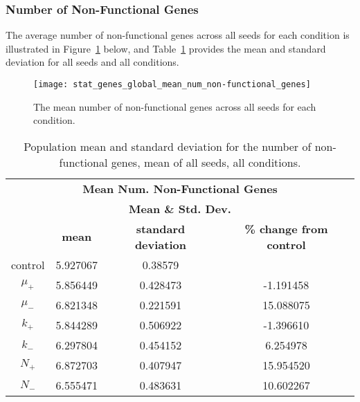 \subsubsection{Number of Non-Functional Genes}\label{results:number_non-functional_genes}
The average number of non-functional genes across all seeds for each condition is illustrated in Figure~\ref{fig:mean_num_non-functional_genes} below, and Table~\ref{table:non-functional_genes_mean_std_dev} provides the mean and standard deviation for all seeds and all conditions.  

\begin{figure}[H]
	\centering
	\texttt{[image: stat\_genes\_global\_mean\_num\_non-functional\_genes]}
	\caption[Mean number of non-functional genes]{The mean number of non-functional genes across all seeds for each condition.}
	\label{fig:mean_num_non-functional_genes}
\end{figure}


\begin{table}[h]
	\centering
	\begin{tabular}{|c|c|c|c|}
		\hline
		\multicolumn{4}{c}{\Large \textbf{Mean Num. Non-Functional Genes}} \\
		\multicolumn{4}{c}{\Large \textbf{Mean \& Std. Dev.}} \\
		\hline
		& \textbf{mean} & \textbf{standard deviation} & \textbf{\% change from control} \\
		\hline
		control & 5.927067 & 0.38579 & \textemdash \\ 
		\hline
		$\mu_+$ & 5.856449 & 0.428473 & -1.191458 \\ 
		\hline
		$\mu_-$ & 6.821348 & 0.221591 & 15.088075 \\ 
		\hline
		$k_+$ & 5.844289 & 0.506922 & -1.396610 \\ 
		\hline
		$k_-$ & 6.297804 & 0.454152 & 6.254978 \\ 
		\hline
		$N_+$ & 6.872703 & 0.407947 & 15.954520 \\ 
		\hline
		$N_-$ & 6.555471 & 0.483631 & 10.602267 \\ 
		\hline
	\end{tabular}
	\caption[Number of Non-functional Genes - Mean \& St. Dev.]{Population mean and standard deviation for the number of non-functional genes, mean of all seeds, all conditions.}
	\label{table:non-functional_genes_mean_std_dev}
\end{table}

